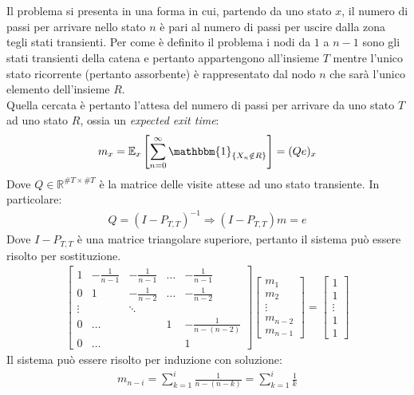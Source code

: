 \documentclass[12pt]{homework}
\begin{document}
\newpage

\section{}%
Il problema si presenta in una forma in cui, partendo da uno stato \(x\), il numero di passi per arrivare nello stato \(n\) è pari al numero di passi per uscire dalla zona tegli stati transienti. Per come è definito il problema i nodi da \(1\) a \(n-1\) sono gli stati transienti della catena e pertanto appartengono all'insieme \(T\) mentre l'unico stato ricorrente (pertanto assorbente) è rappresentato dal nodo \(n\) che sarà l'unico elemento dell'insieme \(R\). \\
Quella cercata è pertanto l'attesa del numero di passi per arrivare da uno stato \(T\) ad uno stato \(R\), ossia un \textit{expected exit time}:
\begin{gather*}
  m_x = \mathbb{E}_x \left[ \sum \limits_{n=0}^{\infty} \mathbbm{1}_{\{X_n \notin R\}}\right] = (Qe)_x
\end{gather*}
Dove \(Q \in \mathbb{R}^{\#T \times \#T}\) è la matrice delle visite attese ad uno stato transiente. In particolare:
\begin{gather*}
  Q = (I-P_{T,T})^{-1} \Rightarrow (I-P_{T,T})m = e
\end{gather*}
Dove \(I-P_{T,T}\) è una matrice triangolare superiore, pertanto il sistema può essere risolto per sostituzione.
\begin{gather*}
  \begin{bmatrix}
    1 & -\frac{1}{n-1} & -\frac{1}{n-1} & \dots & -\frac{1}{n-1} \\
    0 & 1 & -\frac{1}{n-2} & \dots & -\frac{1}{n-2} \\
    \vdots & & \ddots & & \\
    0 &\dots & & 1 & -\frac{1}{n-(n-2)}\\
    0 &\dots  & & & 1
  \end{bmatrix}
  \begin{bmatrix}
    m_1 \\ m_2 \\ \vdots \\ m_{n-2} \\ m_{n-1}
  \end{bmatrix}=
  \begin{bmatrix}
    1 \\ 1 \\ \vdots \\ 1 \\ 1
  \end{bmatrix}
\end{gather*}
Il sistema può essere risolto per induzione con soluzione:
\begin{gather*}
  m_{n-i} =  \sum \limits_{k=1}^{i} \frac{1}{n-(n-k)} =  \sum \limits_{k=1}^{i} \frac{1}{k}
\end{gather*}
\end{document}
